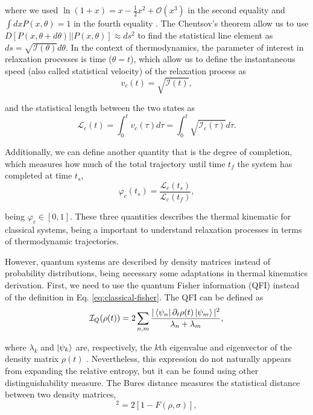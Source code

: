 \noindent where we used $\ln(1+x) = x - \frac{1}{2}x^2 +  \mathcal{O}(x^3)$ in the second equality and $\int dx P(x, \theta) = 1$ in the fourth equality \cite{ibanez-2024}. The Chentsov's theorem allow us to use $D[P(x, \theta+d\theta) || P(x, \theta)] \approx ds^2$ to find the statistical line element as $ds = \sqrt{\mathcal{I}(\theta)} d\theta$. In the context of thermodynamics, the parameter of interest in relaxation processes is time ($\theta = t$), which allow us to define the instantaneous speed (also called statistical velocity) of the relaxation process as
\begin{equation}
    v_{c}(t) = \sqrt{\mathcal{I}(t)},
\end{equation}

\noindent and the statistical length between the two states as
\begin{equation}
    \mathcal{L}_c(t) = \int_0^t v_c(\tau) d\tau = \int_0^t \sqrt{\mathcal{I}_c(\tau)} d\tau.
\end{equation}

\noindent Additionally, we can define another quantity that is the degree of completion, which measures how much of the total trajectory until time $t_f$ the system has completed at time $t_s$,
\begin{equation}
    \varphi_c (t_s) = \frac{\mathcal{L}_c(t_s)}{\mathcal{L}_c(t_f)},
\end{equation}

\noindent being $\varphi_c \in [0,1]$. These three quantities describes the thermal kinematic for classical systems, being a important to understand relaxation processes in terms of thermodynamic trajectories.

However, quantum systems are described by density matrices instead of probability distributions, being necessary some adaptations in thermal kinematics derivation. First, we need to use the quantum Fisher information (QFI) instead of the definition in Eq. \eqref{eq:classical-fisher}. The QFI can be defined as
\begin{equation}
    \mathcal{I}_Q ({\rho}(t)) = 2 \sum_{n,m} \frac{|\bra{\psi_n} \partial_t {\rho}(t) \ket{\psi_m}|^2}{\lambda_n + \lambda_m},
    \label{eq:quantum-fisher}
\end{equation}

\noindent where $\lambda_k$ and $\ket{\psi_k}$ are, respectively, the $k$th eigenvalue and eigenvector of the density matrix $\rho(t)$ \cite{liu-2020,ullah-2026}. Nevertheless, this expression do not naturally appears from expanding the relative entropy, but it can be found using other distinguishability measure. The Bures distance measures the statistical distance between two density matrices,
\begin{equation}
    [D_B ({\rho}, {\sigma})]^2 = 2[1 - F({\rho}, {\sigma})],
\end{equation}

